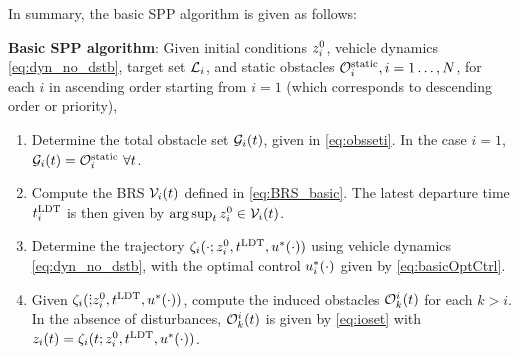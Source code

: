In summary, the basic SPP algorithm is given as follows:

\begin{alg}
\label{alg:basic}
\textbf{Basic SPP algorithm}: Given initial conditions $z_i^0$, vehicle dynamics \eqref{eq:dyn_no_dstb}, target set $\mathcal{L}_i$, and static obstacles $\mathcal{O}^\text{static}_i, i = 1\ldots, N$, for each $i$ in ascending order starting from $i=1$ (which corresponds to descending order or priority),
\begin{enumerate}
\item Determine the total obstacle set $\mathcal{G}_i(t)$, given in \eqref{eq:obsseti}. In the case $i=1$, $\mathcal{G}_i(t) = \mathcal{O}^\text{static}_i ~ \forall t$.
\item Compute the BRS $\mathcal{V}_i(t)$ defined in \eqref{eq:BRS_basic}. The latest departure time $t^\text{LDT}_i$ is then given by $\arg \sup_t z^0_i \in \mathcal{V}_i(t)$.
\item Determine the trajectory $\zeta_i(\cdot; z_i^0, t^\text{LDT}, u^*(\cdot))$ using vehicle dynamics \eqref{eq:dyn_no_dstb}, with the optimal control  $u_i^*(\cdot)$ given by \eqref{eq:basicOptCtrl}.
\item Given $\zeta_i(\dot; z_i^0, t^\text{LDT}, u^*(\cdot))$, compute the induced obstacles $\mathcal{O}_k^i(t)$ for each $k>i$. In the absence of disturbances, $\mathcal{O}_k^i(t)$ is given by \eqref{eq:ioset} with $z_i(t) = \zeta_i(t; z_i^0, t^\text{LDT}, u^*(\cdot))$.
\end{enumerate}
\end{alg}